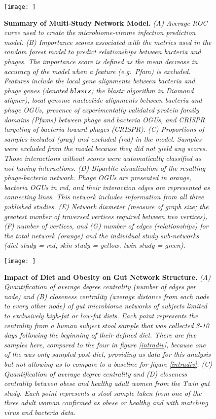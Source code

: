 \documentclass[12pt,]{article}
\begin{document}
\begin{figure}[htbp]
\centering
\texttt{[image: ]}
\caption{\textbf{Summary of Multi-Study Network Model.} \emph{(A)
Average ROC curve used to create the microbiome-virome infection
prediction model. (B) Importance scores associated with the metrics used
in the random forest model to predict relationships between bacteria and
phages. The importance score is defined as the mean decrease in accuracy
of the model when a feature (e.g.~Pfam) is excluded. Features include
the local gene alignments between bacteria and phage genes (denoted
\texttt{blastx}; the blastx algorithm in Diamond aligner), local genome
nucleotide alignments between bacteria and phage OGUs, presence of
experimentally validated protein family domains (Pfams) between phage
and bacteria OGUs, and CRISPR targeting of bacteria toward phages
(CRISPR). (C) Proportions of samples included (gray) and excluded (red)
in the model. Samples were excluded from the model because they did not
yield any scores. Those interactions without scores were automatically
classified as not having interactions. (D) Bipartite visualization of
the resulting phage-bacteria network. Phage OGUs are presented in
orange, bacteria OGUs in red, and their interaction edges are
represented as connecting lines. This network includes information from
all three published studies. (E) Network diameter (measure of graph
size; the greatest number of traversed vertices required between two
vertices), (F) number of vertices, and (G) number of edges
(relationships) for the total network (orange) and the individual study
sub-networks (diet study = red, skin study = yellow, twin study =
green).} \label{RocCurve}}
\end{figure}

\begin{figure}[htbp]
\centering
\texttt{[image: ]}
\caption{\textbf{Impact of Diet and Obesity on Gut Network Structure.}
\emph{(A) Quantification of average degree centrality (number of edges
per node) and (B) closeness centrality (average distance from each node
to every other node) of gut microbiome networks of subjects limited to
exclusively high-fat or low-fat diets. Each point represents the
centrality from a human subject stool sample that was collected 8-10
days following the beginning of their defined diet. There are five
samples here, compared to the four in figure \ref{intradiv}, because one
of the was only sampled post-diet, providing us data for this analysis
but not allowing us to compare to a baseline for figure \ref{intradiv}.
(C) Quantification of average degree centrality and (D) closeness
centrality between obese and healthy adult women from the Twin gut
study. Each point represents a stool sample taken from one of the three
adult woman confirmed as obese or healthy and with matching virus and
bacteria data.} \label{dietnetworks}}
\end{figure}
\end{document}
